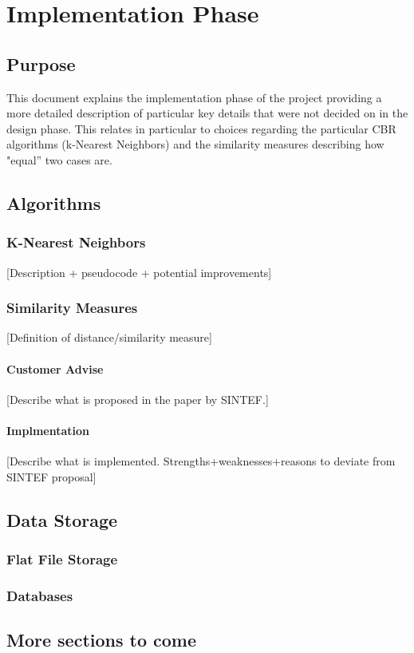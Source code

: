  

\chapter{Implementation Phase}
\label{impl}

\section{Purpose}
This document explains the implementation phase of the
project providing a more detailed description of particular key
details that were not decided on in the design phase. This relates in
particular to choices regarding the particular CBR algorithms
(k-Nearest Neighbors) and the similarity measures describing how
"equal'' two cases are.

\section{Algorithms}

\subsection{K-Nearest Neighbors}

[Description + pseudocode + potential improvements]

\subsection{Similarity Measures}

[Definition of distance/similarity measure]

\subsubsection{Customer Advise}
[Describe what is proposed in the paper by SINTEF.]

\subsubsection{Implmentation}
[Describe what is implemented. Strengths+weaknesses+reasons to deviate
from SINTEF proposal]

\section{Data Storage}

\subsection{Flat File Storage}

\subsection{Databases}

\section{More sections to come}

